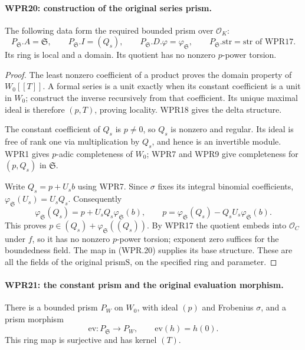 \documentclass[11pt,a4paper]{article}
\numberwithin{equation}{section}
\theoremstyle{remark}\newtheorem{remark}[theorem]{Remark}
\begin{document}
\paragraph{WPR20: construction of the original series prism.}
\label{claim:WPR20}
The following data form the required bounded prism over
$\mathcal O_K$:
\[
 P_{\mathfrak S}.A=\mathfrak S,
 \qquad P_{\mathfrak S}.I=(Q_s),
 \qquad P_{\mathfrak S}.D.\varphi=\varphi_{\mathfrak S},
 \qquad P_{\mathfrak S}.\mathrm{str}=\mathrm{str}
                     \text{ of WPR17}.                       \tag{WPR.24}
\]
Its ring is local and a domain. Its quotient has no nonzero
$p$-power torsion.

\begin{proof}
The least nonzero coefficient of a product proves the domain
property of $W_0[[T]]$. A formal series is a unit exactly when
its constant coefficient is a unit in $W_0$; construct the
inverse recursively from that coefficient. Its unique maximal
ideal is therefore $(p,T)$, proving locality. WPR18 gives the
delta structure.

The constant coefficient of $Q_s$ is $p\neq0$, so $Q_s$ is
nonzero and regular. Its ideal is free of rank one via
multiplication by $Q_s$, and hence is an invertible module.
WPR1 gives $p$-adic completeness of $W_0$; WPR7 and WPR9
give completeness for $(p,Q_s)$ in $\mathfrak S$.

Write $Q_s=p+U_s b$ using WPR7. Since $\sigma$ fixes its
integral binomial coefficients,
$\varphi_{\mathfrak S}(U_s)=U_sQ_s$. Consequently
\[
 \varphi_{\mathfrak S}(Q_s)
     =p+U_sQ_s\varphi_{\mathfrak S}(b),\qquad
 p=\varphi_{\mathfrak S}(Q_s)
          -Q_sU_s\varphi_{\mathfrak S}(b).
 \tag{WPR.25}
\]
This proves $p\in(Q_s)+\varphi_{\mathfrak S}((Q_s))$.
By WPR17 the quotient embeds into $\mathcal O_C$ under $f$,
so it has no nonzero $p$-power torsion; exponent zero suffices
for the boundedness field. The map in (WPR.20) supplies its
base structure. These are all the fields of the original
$\mathrm{prismS}$, on the specified ring and parameter.
\end{proof}

\paragraph{WPR21: the constant prism and the original evaluation morphism.}
\label{claim:WPR21}
There is a bounded prism $P_W$ on $W_0$, with ideal $(p)$ and
Frobenius $\sigma$, and a prism morphism
\[
 \mathrm{ev}:P_{\mathfrak S}\longrightarrow P_W,
 \qquad \mathrm{ev}(h)=h(0).
 \tag{WPR.26}
\]
This ring map is surjective and has kernel $(T)$.
\end{document}
